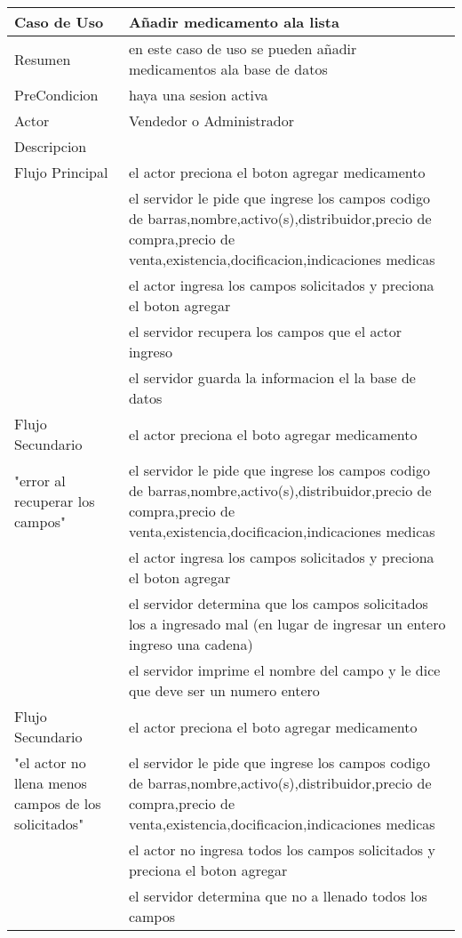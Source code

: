 \documentclass{book}
\begin{document}
	\begin{table}[H]
		\centering
		\begin{tabular}{p{3cm} p{11cm}}
			\hline
				Caso de Uso & Añadir medicamento ala lista\\
			\hline 
				Resumen & en este caso de uso se pueden añadir medicamentos ala base de datos\\
			\hline
				PreCondicion&haya una sesion activa\\
			\hline
				Actor & Vendedor o Administrador\\
			\hline
				Descripcion&\\
				Flujo Principal&el actor preciona el boton agregar medicamento
				\\&el servidor le pide que ingrese los campos codigo de barras,nombre,activo(s),distribuidor,precio de compra,precio de venta,existencia,docificacion,indicaciones medicas
				\\&el actor ingresa los campos solicitados y preciona el boton agregar
				\\&el servidor recupera los campos que el actor ingreso
				\\&el servidor guarda la informacion el la base de datos\\
			\hline
				Flujo Secundario&el actor preciona el boto agregar medicamento\\
				"error al recuperar los campos"&el servidor le pide que ingrese los campos codigo de barras,nombre,activo(s),distribuidor,precio de compra,precio de venta,existencia,docificacion,indicaciones medicas
				\\&el actor ingresa los campos solicitados y preciona el boton agregar
				\\&el servidor determina que los campos solicitados los a ingresado mal (en lugar de ingresar un entero ingreso una cadena)
				\\&el servidor imprime el nombre del campo y le dice que deve ser un numero entero\\
			\hline
				Flujo Secundario&el actor preciona el boto agregar medicamento\\
				"el actor no llena menos campos de los solicitados"&el servidor le pide que ingrese los campos codigo de barras,nombre,activo(s),distribuidor,precio de compra,precio de venta,existencia,docificacion,indicaciones medicas
				\\&el actor no ingresa todos los campos solicitados y preciona el boton agregar
				\\&el servidor determina que no a llenado todos los campos

\end{tabular}
\end{table}
\end{document}
